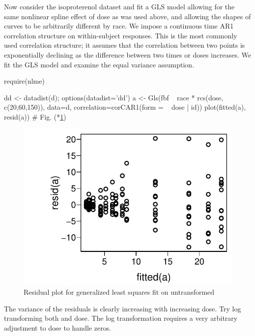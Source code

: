 Now consider the isoproterenol dataset and fit a GLS model allowing for
the same nonlinear spline effect of dose as was used above, and
allowing the shapes of curves to be arbitrarily different by race.  We
impose a continuous time AR1 correlation structure on within-subject
responses.  This is the most commonly used correlation structure; it
assumes that the correlation between two points is exponentially
declining as the difference between two times or doses
increases.
We fit the GLS model and examine the equal variance assumption.
\begin{Schunk}
\begin{Sinput}
require(nlme)
\end{Sinput}
\begin{Sinput}
dd <- datadist(d); options(datadist='dd')
a <- Gls(fbf ~ race * rcs(dose, c(20,60,150)), data=d,
         correlation=corCAR1(form = ~ dose | id))
plot(fitted(a), resid(a))   # Fig. (*\ref{fig:serial-glsa}\ipacue*)
\end{Sinput}
\begin{figure}[htbp]

\centerline{\includegraphics[width=\maxwidth]{serial-glsa-1} }

\caption[Residual plot for generalized least squares fit on untransformed  ]{Residual plot for generalized least squares fit on untransformed  }\label{fig:serial-glsa}
\end{figure}
\end{Schunk}
The variance of the residuals is clearly increasing with increasing
dose.  Try log transforming both  and dose.  The log
transformation requires a very arbitrary adjustment to dose to handle zeros.

